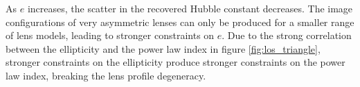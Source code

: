 As $e$ increases, the scatter in the recovered Hubble constant decreases. The image configurations of very asymmetric lenses can only be produced for a smaller range of lens models, leading to stronger constraints on $e$. Due to the strong correlation between the ellipticity and the power law index in figure \ref{fig:los_triangle}, stronger constraints on the ellipticity produce stronger constraints on the power law index, breaking the lens profile degeneracy. 